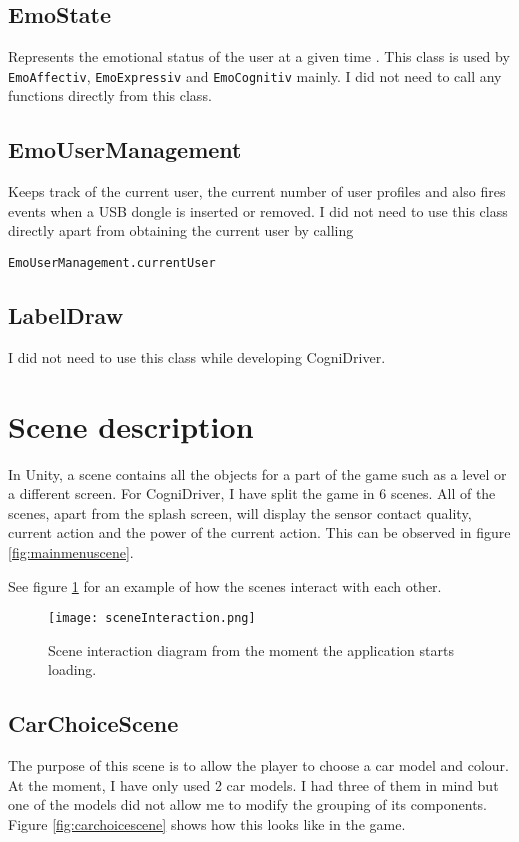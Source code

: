 \subsection{EmoState}
Represents the emotional status of the user at a given time \cite{emotivSDKUserManual}. This class is used by \texttt{EmoAffectiv}, \texttt{EmoExpressiv} and \texttt{EmoCognitiv} mainly. I did not need to call any functions directly from this class.

\subsection{EmoUserManagement}
Keeps track of the current user, the current number of user profiles and also fires events when a USB dongle is inserted or removed. I did not need to use this class directly apart from obtaining the current user by calling

\begin{Verbatim}[frame=single, framesep=3mm]
EmoUserManagement.currentUser
\end{Verbatim}

\subsection{LabelDraw}
I did not need to use this class while developing CogniDriver.

\section{Scene description}
In Unity, a scene contains all the objects for a part of the game such as a level or a different screen. For CogniDriver, I have split the game in 6 scenes. All of the scenes, apart from the splash screen, will display the sensor contact quality, current action and the power of the current action. This can be observed in figure \ref{fig:mainmenuscene}.

See figure \ref{fig:sceneInteraction} for an example of how the scenes interact with each other.

\begin{figure}
  \centering
  \texttt{[image: sceneInteraction.png]}
  \caption{Scene interaction diagram from the moment the application starts loading.}
    \label{fig:sceneInteraction}           
\end{figure}

\subsection{CarChoiceScene}
The purpose of this scene is to allow the player to choose a car model and colour. At the moment, I have only used 2 car models. I had three of them in mind but one of the models did not allow me to modify the grouping of its components. Figure \ref{fig:carchoicescene} shows how this looks like in the game.


